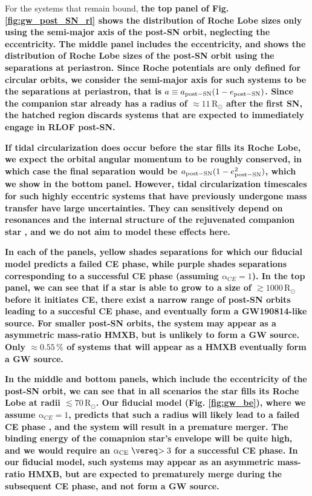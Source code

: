 \documentclass[linenumbers,trackchanges,twocolumn]{aastex701}
\newcommand{\Rdot}{\mathrm{R}_{\odot}}
\begin{document}
For the systems that remain bound, \textbf{the top panel of Fig. \ref{fig:gw_post_SN_rl} shows the distribution of Roche Lobe sizes only using the semi-major axis of the post-SN orbit, neglecting the eccentricity. The middle panel includes the eccentricity, and shows the distribution of Roche Lobe sizes of the post-SN orbit using the separations at periastron. Since Roche potentials are only defined for circular orbits, we consider the semi-major axis for such systems to be the separations at periastron, that is $a \equiv a_{\rm post-SN}(1-e_{\rm post-SN})$. Since the companion star already has a radius of $\approx 11\,\Rdot$ after the first SN, the hatched region discards systems that are expected to immediately engage in RLOF post-SN. }

\textbf{If tidal circularization does occur before the star fills its Roche Lobe, we expect the orbital angular momentum to be roughly conserved, in which case the final separation would be $a_{\rm post-SN}(1-e^2_{\rm post-SN})$, which we show in the bottom panel. However, tidal circularization timescales for such highly eccentric systems that have previously undergone mass transfer have large uncertainties. They can sensitively depend on resonances and the internal structure of the rejuvenated companion star \citep{1977A&A....57..383Z, 2002MNRAS.329..897H, 2018A&A...616A..28Q, 2023ApJ...952...53M}, and we do not aim to model these effects here.}

\textbf{In each of the panels, yellow shades separations for which our fiducial model predicts a failed CE phase, while purple shades separations corresponding to a successful CE phase (assuming $\mathrm \alpha_{CE} = 1$). In the top panel, we can see that if a star is able to grow to a size of $\gtrsim 1000\,\Rdot$ before it initiates CE, there exist a narrow range of post-SN orbits leading to a succesful CE phase, and eventually form a GW190814-like source. For smaller post-SN orbits, the system may appear as a asymmetric mass-ratio HMXB, but is unlikely to form a GW source. Only $\approx 0.55\,\%$ of systems that will appear as a HMXB eventually form a GW source.} 

\textbf{In the middle and bottom panels, which include the eccentricity of the post-SN orbit, we can see that in all scenarios the star fills its Roche Lobe at radii $\lesssim 70\,\Rdot$. Our fiducial model (Fig. \ref{fig:gw_be}), where we assume $\mathrm \alpha_{CE} = 1$, predicts that such a radius will likely lead to a failed CE phase \citep{2021A&A...645A..54K}, and the system will result in a premature merger. The binding energy of the comapnion star's envelope will be quite high, and we would require an $\rm \alpha_{CE} \gtrsim 3$ for a successful CE phase. In our fiducial model, such systems may appear as an asymmetric mass-ratio HMXB, but are expected to prematurely merge during the subsequent CE phase, and not form a GW source.}
\end{document}
